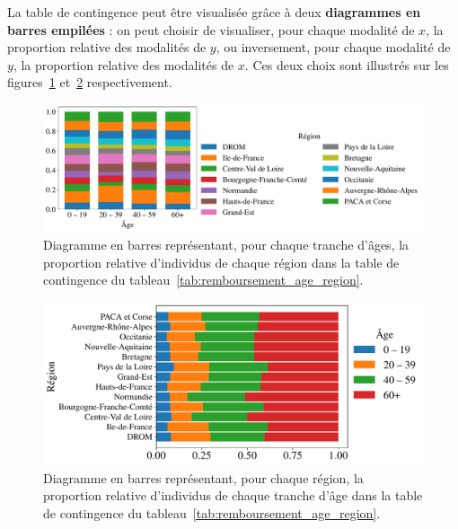 \begin{exemple}
La table de contingence peut être visualisée grâce à deux \textbf{diagrammes en
	barres empilées} : on peut choisir de visualiser, pour chaque modalité de $x$, la
proportion relative des modalités de $y$, ou inversement, pour chaque modalité de $y$,
la proportion relative des modalités de $x$. Ces deux choix sont illustrés sur les
figures~\ref{fig:remboursement_age_region_lines}
et~\ref{fig:remboursement_age_region_cols} respectivement.


\begin{figure}[H]
	\centering
	\includegraphics[width=\textwidth]{figures/stats/remboursement_age_region_lines}
	\caption{Diagramme en barres représentant, pour chaque tranche d'âges, la
		proportion relative d'individus de chaque région dans la table de
		contingence du tableau~\ref{tab:remboursement_age_region}.}
	\label{fig:remboursement_age_region_lines}
\end{figure}


\begin{figure}[H]
	\centering
	\includegraphics[width=\textwidth]{figures/stats/remboursement_age_region_cols}
	\caption{Diagramme en barres représentant, pour chaque région, la proportion
		relative d'individus de chaque tranche d'âge dans la table de contingence du
		tableau~\ref{tab:remboursement_age_region}.}
	\label{fig:remboursement_age_region_cols}
\end{figure}
\end{exemple}




